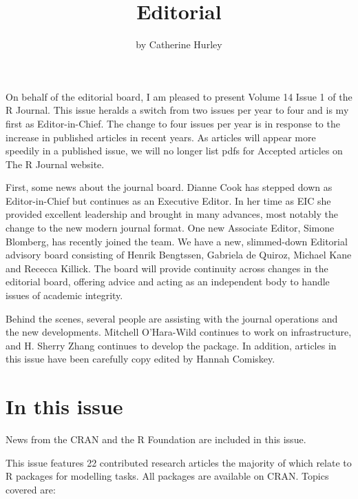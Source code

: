 \title{Editorial}
\author{by Catherine Hurley}

\maketitle


On behalf of the editorial board, I am pleased to present Volume 14 Issue 1 of the R Journal. This
issue heralds a switch from two issues per year to four and is my first as Editor-in-Chief. The change to four issues per year is in response to the increase in published articles in recent years. As articles will appear more speedily
in a published issue, we will no longer list pdfs for Accepted articles on The R Journal website.

First, some news about the journal board. Dianne Cook has stepped down as Editor-in-Chief but continues as an Executive Editor. In her time as EIC she provided excellent leadership and brought in many advances, most notably the change to the new modern journal format. One new Associate Editor, Simone Blomberg, has recently joined the team. We have a new, slimmed-down Editorial advisory board consisting of Henrik Bengtssen, Gabriela de Quiroz, Michael Kane and Rececca Killick. The board will provide continuity across changes in the editorial board, offering advice and acting as an independent body to handle issues of academic integrity.

Behind the scenes, several people are assisting with the journal operations and the new developments. Mitchell O'Hara-Wild continues to work on infrastructure, and H. Sherry Zhang continues to develop the  package. In addition, articles in this issue have been carefully copy edited by Hannah Comiskey.

\hypertarget{in-this-issue}{%
\section{In this issue}\label{in-this-issue}}

News from the CRAN and the R Foundation are included in this issue.

This issue features 22 contributed research articles the majority of which relate to R packages
for modelling tasks. All packages are available on CRAN. Topics covered are:

